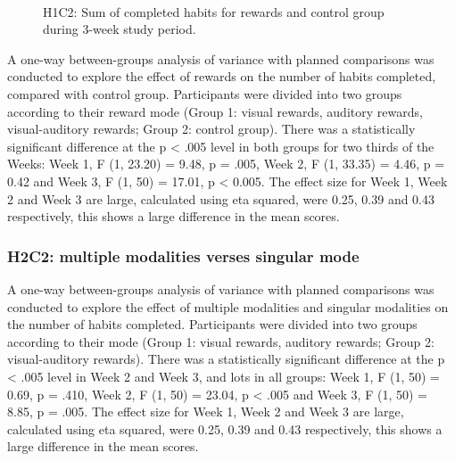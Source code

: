 \documentclass{scaffold/sigchi}
\begin{document}
\begin{figure}
  \centering
  \caption{H1C2: Sum of completed habits for rewards and control group during 3-week study period.}~\label{fig:c2_h2}
\end{figure}

A one-way between-groups analysis of variance with planned comparisons was conducted to explore the effect of rewards on the number of habits completed, compared with control group. Participants were divided into two groups according to their reward mode (Group 1: visual rewards, auditory rewards, visual-auditory rewards; Group 2: control group). There was a statistically significant difference at the p < .005 level in both groups for two thirds of the Weeks: Week 1, F (1, 23.20) = 9.48, p = .005, Week 2, F (1, 33.35) = 4.46, p = 0.42 and Week 3, F (1, 50) = 17.01, p < 0.005. The effect size for Week 1, Week 2 and Week 3 are large, calculated using eta squared, were 0.25, 0.39 and 0.43 respectively, this shows a large difference in the mean scores.

\subsubsection{H2C2: multiple modalities verses singular mode}

A one-way between-groups analysis of variance with planned comparisons was conducted to explore the effect of multiple modalities and singular modalities on the number of habits completed. Participants were divided into two groups according to their mode (Group 1: visual rewards, auditory rewards; Group 2: visual-auditory rewards). There was a statistically significant difference at the p < .005 level in Week 2 and Week 3, and lots in all groups: Week 1, F (1, 50) = 0.69, p = .410, Week 2, F (1, 50) = 23.04, p < .005 and Week 3, F (1, 50) = 8.85, p = .005. The effect size for Week 1, Week 2 and Week 3 are large, calculated using eta squared, were 0.25, 0.39 and 0.43 respectively, this shows a large difference in the mean scores.
\end{document}
